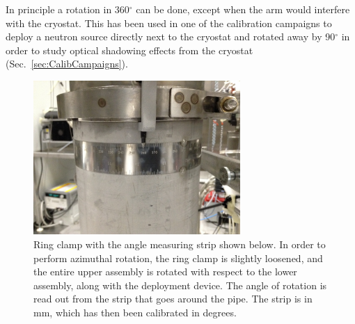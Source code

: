 In principle a rotation in 360$^\circ$ can be done, except when the arm would interfere with the cryostat. This has been used in one of the calibration campaigns to deploy a neutron source directly next to the cryostat and rotated away by 90$^\circ$ in order to study optical shadowing effects from the cryostat (Sec.~\ref{sec:CalibCampaigns}). 





\begin{figure}[htbp]
 \centering
  \includegraphics[width=0.7\textwidth]{Figures/RingClamp_WithPin_IMG_2669.JPG}
  \caption{Ring clamp  with the angle measuring strip shown below. In order to perform azimuthal rotation, the ring clamp is slightly loosened, and the entire upper assembly is rotated with respect to the lower assembly, along with the deployment device. The angle of rotation is read out from the strip that goes around the pipe. The strip is in mm, which has then been calibrated in degrees.}
  \label{fig:ring_clamp}
\end{figure} 

